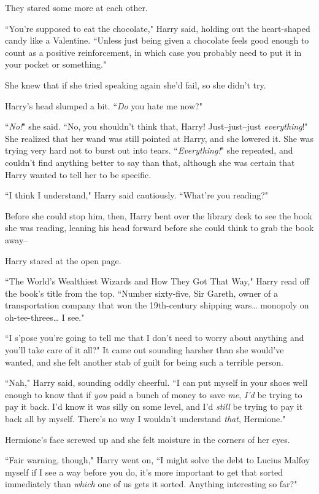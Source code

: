They stared some more at each other.

``You're supposed to eat the chocolate," Harry said, holding out the heart-shaped candy like a Valentine. ``Unless just being given a chocolate feels good enough to count as a positive reinforcement, in which case you probably need to put it in your pocket or something."

She knew that if she tried speaking again she'd fail, so she didn't try.

Harry's head slumped a bit. ``\emph{Do} you hate me now?"

``\emph{No!}" she said. ``No, you shouldn't think that, Harry! Just\---just\---just \emph{everything}!" She realized that her wand was still pointed at Harry, and she lowered it. She was trying very hard not to burst out into tears. ``\emph{Everything!}" she repeated, and couldn't find anything better to say than that, although she was certain that Harry wanted to tell her to be specific.

``I think I understand," Harry said cautiously. ``What're you reading?"

Before she could stop him, then, Harry bent over the library desk to see the book she was reading, leaning his head forward before she could think to grab the book away\---

Harry stared at the open page.

``The World's Wealthiest Wizards and How They Got That Way," Harry read off the book's title from the top. ``Number sixty-five, Sir Gareth, owner of a transportation company that won the 19th-century shipping wars{\ldots} monopoly on oh-tee-threes{\ldots} I see."

``I s'pose you're going to tell me that I don't need to worry about anything and you'll take care of it all?" It came out sounding harsher than she would've wanted, and she felt another stab of guilt for being such a terrible person.

``Nah," Harry said, sounding oddly cheerful. ``I can put myself in your shoes well enough to know that if \emph{you} paid a bunch of money to save \emph{me}, \emph{I'd} be trying to pay it back. I'd know it was silly on some level, and I'd \emph{still} be trying to pay it back all by myself. There's no way I wouldn't understand \emph{that}, Hermione."

Hermione's face screwed up and she felt moisture in the corners of her eyes.

``Fair warning, though," Harry went on, ``I might solve the debt to Lucius Malfoy myself if I see a way before you do, it's more important to get that sorted immediately than \emph{which} one of us gets it sorted. Anything interesting so far?"

